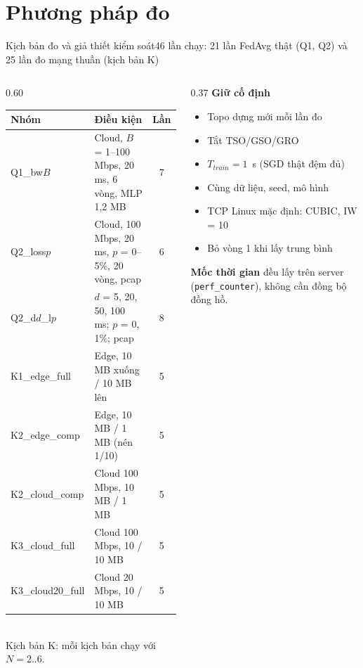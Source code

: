 \documentclass[aspectratio=169,10pt]{beamer}
\begin{document}
\section{Phương pháp đo}

\begin{frame}{Kịch bản đo và giả thiết kiểm soát}{46 lần chạy: 21 lần FedAvg thật (Q1, Q2) và 25 lần đo mạng thuần (kịch bản K)}
  \begin{columns}[T]
    \begin{column}{0.60\textwidth}
      \scriptsize
      \begin{tabularx}{\linewidth}{>{\raggedright\arraybackslash}p{2.2cm} >{\raggedright\arraybackslash}X c}
        \toprule
        \textbf{Nhóm} & \textbf{Điều kiện} & \textbf{Lần} \\
        \midrule
        Q1\_bw$B$ & Cloud, $B$ = 1--100 Mbps, 20 ms, 6 vòng, MLP 1,2 MB & 7 \\
        Q2\_loss$p$ & Cloud, 100 Mbps, 20 ms, $p$ = 0--5\%, 20 vòng, pcap & 6 \\
        Q2\_d$d$\_l$p$ & $d$ = 5, 20, 50, 100 ms; $p$ = 0, 1\%; pcap & 8 \\
        \midrule
        K1\_edge\_full & Edge, 10 MB xuống / 10 MB lên & 5 \\
        K2\_edge\_comp & Edge, 10 MB / 1 MB (nén 1/10) & 5 \\
        K2\_cloud\_comp & Cloud 100 Mbps, 10 MB / 1 MB & 5 \\
        K3\_cloud\_full & Cloud 100 Mbps, 10 / 10 MB & 5 \\
        K3\_cloud20\_full & Cloud 20 Mbps, 10 / 10 MB & 5 \\
        \bottomrule
      \end{tabularx}
      \\[2pt] {\tiny Kịch bản K: mỗi kịch bản chạy với $N = 2..6$.}
    \end{column}
    \begin{column}{0.37\textwidth}
      \footnotesize
      \textbf{Giữ cố định}
      \begin{itemize}
        \item Topo dựng mới mỗi lần đo
        \item Tắt TSO/GSO/GRO
        \item $T_{train} = 1$~s (SGD thật đệm đủ)
        \item Cùng dữ liệu, seed, mô hình
        \item TCP Linux mặc định: CUBIC, IW = 10
        \item Bỏ vòng 1 khi lấy trung bình
      \end{itemize}
      \textbf{Mốc thời gian} đều lấy trên server (\texttt{perf\_counter}), không cần đồng bộ đồng hồ.
    \end{column}
  \end{columns}
\end{frame}
\end{document}
